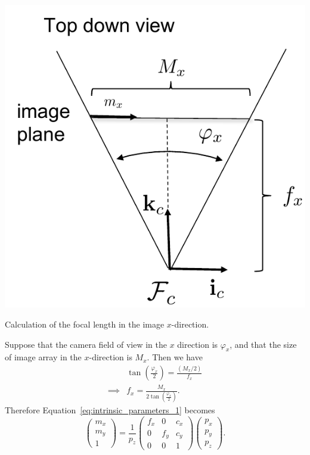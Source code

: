 \begin{marginfigure}
  \includegraphics[width=\linewidth]{chap6_camera_features/figures/focal_length_calc}
  \caption{Calculation of the focal length in the image $x$-direction.}
  \label{fig:focal_length_calculation}  
\end{marginfigure}
Suppose that the camera field of view in the $x$ direction is $\varphi_x$, and that the size of image array in the $x$-direction is $M_x$.  Then we have 
\begin{align*}
& \tan\left(\frac{\varphi_x}{2}\right) = \frac{(M_x/2)}{f_x} \\
\implies & f_x = \frac{M_x}{2\tan\left(\frac{\varphi_x}{2}\right)}.
\end{align*}
Therefore Equation~\eqref{eq:intrinsic_parameters_1} becomes
\[
\begin{pmatrix}m_x \\ m_y \\ 1\end{pmatrix} 
	= \frac{1}{p_z}\begin{pmatrix} f_x & 0 & c_x \\ 0 & f_y & c_y \\ 0 & 0 & 1 \end{pmatrix}\begin{pmatrix}p_x \\ p_y \\ p_z \end{pmatrix}.
\]
